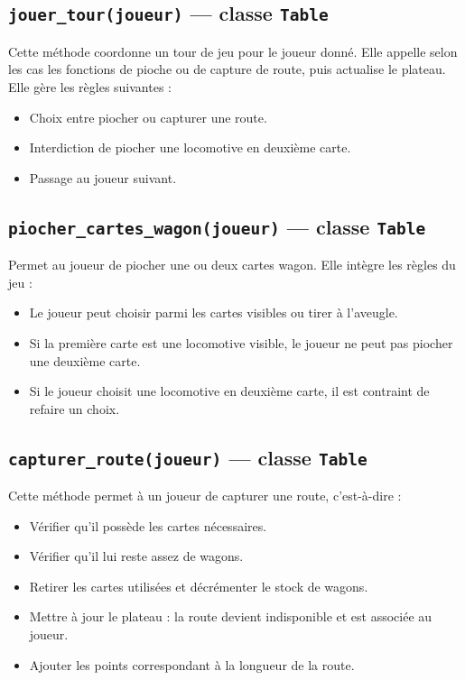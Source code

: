 \documentclass[a4paper,12pt]{report}
\begin{document}
\subsection*{\texttt{jouer\_tour(joueur)} — classe \texttt{Table}}

Cette méthode coordonne un tour de jeu pour le joueur donné.
Elle appelle selon les cas les fonctions de pioche ou de capture de route, puis actualise le plateau.
Elle gère les règles suivantes :
\begin{itemize}
    \item Choix entre piocher ou capturer une route.
    \item Interdiction de piocher une locomotive en deuxième carte.
    \item Passage au joueur suivant.
\end{itemize}

\subsection*{\texttt{piocher\_cartes\_wagon(joueur)} — classe \texttt{Table}}

Permet au joueur de piocher une ou deux cartes wagon. Elle intègre les règles du jeu :
\begin{itemize}
    \item Le joueur peut choisir parmi les cartes visibles ou tirer à l’aveugle.
    \item Si la première carte est une locomotive visible, le joueur ne peut pas piocher une deuxième carte.
    \item Si le joueur choisit une locomotive en deuxième carte, il est contraint de refaire un choix.
\end{itemize}

\subsection*{\texttt{capturer\_route(joueur)} — classe \texttt{Table}}

Cette méthode permet à un joueur de capturer une route, c’est-à-dire :
\begin{itemize}
    \item Vérifier qu’il possède les cartes nécessaires.
    \item Vérifier qu’il lui reste assez de wagons.
    \item Retirer les cartes utilisées et décrémenter le stock de wagons.
    \item Mettre à jour le plateau : la route devient indisponible et est associée au joueur.
    \item Ajouter les points correspondant à la longueur de la route.
\end{itemize}
\end{document}
